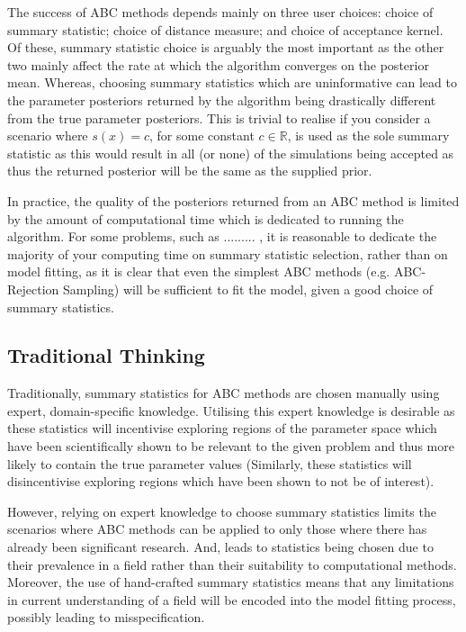 \documentclass[bibliography=totoc,11pt,a4paper,margin=0]{article}
\theoremstyle{break}
\begin{document}
  The success of ABC methods depends mainly on three user choices: choice of summary statistic; choice of distance measure; and choice of acceptance kernel. Of these, summary statistic choice is arguably the most important as the other two mainly affect the rate at which the algorithm converges on the posterior mean. Whereas, choosing summary statistics which are uninformative can lead to the parameter posteriors returned by the algorithm being drastically different from the true parameter posteriors. This is trivial to realise if you consider a scenario where $s(x)=c$, for some constant $c\in\mathbb{R}$, is used as the sole summary statistic as this would result in all (or none) of the simulations being accepted as thus the returned posterior will be the same as the supplied prior.

  \par In practice, the quality of the posteriors returned from an ABC method is limited by the amount of computational time which is dedicated to running the algorithm. For some problems, such as ......... %
  , it is reasonable to dedicate the majority of your computing time on summary statistic selection, rather than on model fitting, as it is clear that even the simplest ABC methods (e.g. ABC-Rejection Sampling) will be sufficient to fit the model, given a good choice of summary statistics.

  \subsection*{Traditional Thinking}\label{sec_summary_stats_traditional_thinking}

  \par Traditionally, summary statistics for ABC methods are chosen manually using expert, domain-specific knowledge. Utilising this expert knowledge is desirable as these statistics will incentivise exploring regions of the parameter space which have been scientifically shown to be relevant to the given problem and thus more likely to contain the true parameter values (Similarly, these statistics will disincentivise exploring regions which have been shown to not be of interest). %


  \par However, relying on expert knowledge to choose summary statistics limits the scenarios where ABC methods can be applied to only those where there has already been significant research. And, leads to statistics being chosen due to their prevalence in a field rather than their suitability to computational methods. Moreover, the use of hand-crafted summary statistics means that any limitations in current understanding of a field will be encoded into the model fitting process, possibly leading to misspecification.
\end{document}
